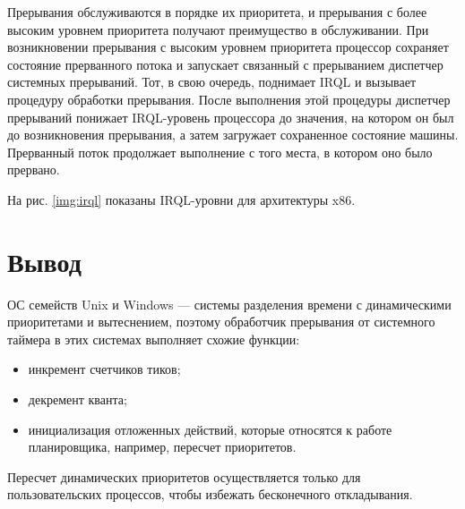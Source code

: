 Прерывания обслуживаются в порядке их приоритета, и прерывания с более
высоким уровнем приоритета получают преимущество в обслуживании. При
возникновении прерывания с высоким уровнем приоритета процессор сохраняет состояние прерванного потока и запускает связанный с прерыванием диспетчер системных прерываний. Тот, в свою очередь, поднимает IRQL и вызывает процедуру
обработки прерывания. После выполнения этой процедуры диспетчер прерываний понижает IRQL-уровень процессора до значения, на котором он был до возникновения прерывания, а затем загружает сохраненное состояние машины.
Прерванный поток продолжает выполнение с того места, в котором оно было
прервано.

На рис. \ref{img:irql} показаны IRQL-уровни для архитектуры x86.
\FloatBarrier


\chapter*{Вывод}

 ОС семейств Unix и Windows --- системы разделения времени с динамическими приоритетами и вытеснением, поэтому обработчик прерывания от системного таймера в этих системах выполняет схожие функции:
\begin{itemize}
	\item инкремент счетчиков тиков;
	\item декремент кванта;
	\item инициализация отложенных действий, которые относятся к работе планировщика, например, пересчет приоритетов.
\end{itemize}

Пересчет динамических приоритетов осуществляется только для пользовательских процессов, чтобы избежать бесконечного откладывания.


